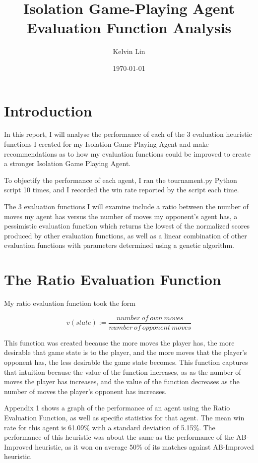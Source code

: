 \documentclass[12pt]{article}
\title{Isolation Game-Playing Agent Evaluation Function Analysis}
\author{
        Kelvin Lin
}
\date{\today}
\begin{document}
\maketitle

\section{Introduction}
In this report, I will analyse the performance of each of the 3 evaluation heuristic functions I created for my Isolation Game Playing Agent and make recommendations as to how my evaluation functions could be improved to create a stronger Isolation Game Playing Agent. 

To objectify the performance of each agent, I ran the tournament.py Python script 10 times, and I recorded the win rate reported by the script each time.

The 3 evaluation functions I will examine include a ratio between the number of moves my agent has versus the number of moves my opponent's agent has, a pessimistic evaluation function which returns the lowest of the normalized scores produced by other evaluation functions, as well as a linear combination of other evaluation functions with parameters determined using a genetic algorithm.

\section{The Ratio Evaluation Function}
My ratio evaluation function took the form

\begin{equation*}
v(state):=\dfrac{number\ of\ own\ moves}{number\ of\ opponent\ moves}
\end{equation*}

This function was created because the more moves the player has, the more desirable that game state is to the player, and the more moves that the player's opponent has, the less desirable the game state becomes. This function captures that intuition because the value of the function increases, as as the number of moves the player has increases, and the value of the function decreases as the number of moves the player's opponent has increases.

Appendix 1 shows a graph of the performance of an agent using the Ratio Evaluation Function, as well as specific statistics for that agent. The mean win rate for this agent is 61.09\% with a standard deviation of 5.15\%. The performance of this heuristic was about the same as the performance of the AB-Improved heuristic, as it won on average 50\% of its matches against AB-Improved heuristic.
\end{document}
